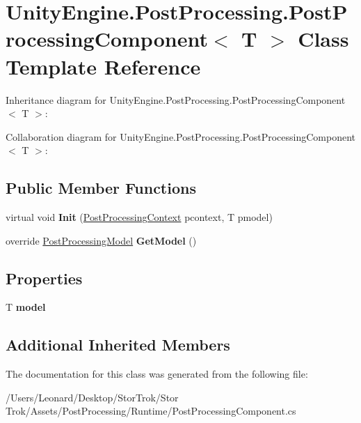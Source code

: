 \hypertarget{class_unity_engine_1_1_post_processing_1_1_post_processing_component}{}\section{Unity\+Engine.\+Post\+Processing.\+Post\+Processing\+Component$<$ T $>$ Class Template Reference}
\label{class_unity_engine_1_1_post_processing_1_1_post_processing_component}


Inheritance diagram for Unity\+Engine.\+Post\+Processing.\+Post\+Processing\+Component$<$ T $>$\+:


Collaboration diagram for Unity\+Engine.\+Post\+Processing.\+Post\+Processing\+Component$<$ T $>$\+:
\subsection*{Public Member Functions}
\begin{DoxyCompactItemize}
\item 
\mbox{\label{class_unity_engine_1_1_post_processing_1_1_post_processing_component_a982348916489395b61300b2ed37784a3}} 
virtual void {\bfseries Init} (\hyperlink{class_unity_engine_1_1_post_processing_1_1_post_processing_context}{Post\+Processing\+Context} pcontext, T pmodel)
\item 
\mbox{\label{class_unity_engine_1_1_post_processing_1_1_post_processing_component_ac946ffb514e0ebb0141e87777459ffc9}} 
override \hyperlink{class_unity_engine_1_1_post_processing_1_1_post_processing_model}{Post\+Processing\+Model} {\bfseries Get\+Model} ()
\end{DoxyCompactItemize}
\subsection*{Properties}
\begin{DoxyCompactItemize}
\item 
\mbox{\label{class_unity_engine_1_1_post_processing_1_1_post_processing_component_a7af78d4436d104b01373d1bf0f7bcedf}} 
T {\bfseries model}
\end{DoxyCompactItemize}
\subsection*{Additional Inherited Members}


The documentation for this class was generated from the following file\+:\begin{DoxyCompactItemize}
\item 
/\+Users/\+Leonard/\+Desktop/\+Stor\+Trok/\+Stor Trok/\+Assets/\+Post\+Processing/\+Runtime/Post\+Processing\+Component.\+cs\end{DoxyCompactItemize}

